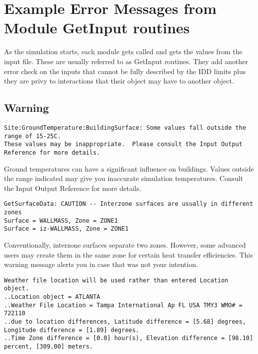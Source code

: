 \section{Example Error Messages from Module GetInput routines}\label{example-error-messages-from-module-getinput-routines}

As the simulation starts, each module gets called and gets the values from the input file. These are usually referred to as GetInput routines. They add another error check on the inputs that cannot be fully described by the IDD limits plus they are privy to interactions that their object may have to another object.

\subsection{Warning}\label{warning-002}

\begin{lstlisting}
Site:GroundTemperature:BuildingSurface: Some values fall outside the range of 15-25C.
These values may be inappropriate.  Please consult the Input Output Reference for more details.
\end{lstlisting}

Ground temperatures can have a significant influence on buildings. Values outside the range indicated may give you inaccurate simulation temperatures. Consult the Input Output Reference for more details.

\begin{lstlisting}
GetSurfaceData: CAUTION -- Interzone surfaces are usually in different zones
Surface = WALLMASS, Zone = ZONE1
Surface = iz-WALLMASS, Zone = ZONE1
\end{lstlisting}

Conventionally, interzone surfaces separate two zones. However, some advanced users may create them in the same zone for certain heat transfer efficiencies. This warning message alerts you in case that was not your intention.

\begin{lstlisting}
Weather file location will be used rather than entered Location object.
..Location object = ATLANTA
..Weather File Location = Tampa International Ap FL USA TMY3 WMO# = 722110
..due to location differences, Latitude difference = [5.68] degrees, Longitude difference = [1.89] degrees.
..Time Zone difference = [0.0] hour(s), Elevation difference = [98.10] percent, [309.00] meters.
\end{lstlisting}

